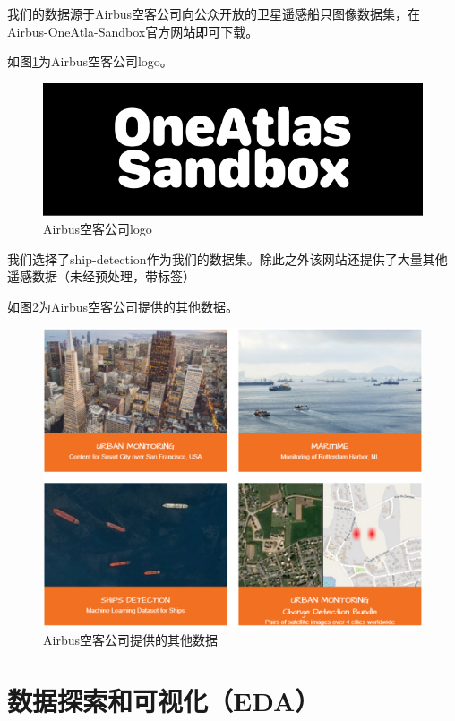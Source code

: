 我们的数据源于Airbus空客公司向公众开放的卫星遥感船只图像数据集，在Airbus-OneAtla-Sandbox官方网站即可下载。

如图\ref{fig::EDA3}为Airbus空客公司logo。

\begin{figure}[htbp]
\centering
\includegraphics[width=0.6\linewidth]{body/EDA_pic/OnaAtlasSandbox_Logo}
\caption{Airbus空客公司logo}
\label{fig::EDA3}
\end{figure}

我们选择了ship-detection作为我们的数据集。除此之外该网站还提供了大量其他遥感数据（未经预处理，带标签）

如图\ref{fig::EDA4}为Airbus空客公司提供的其他数据。

\begin{figure}[htbp]
\centering
\includegraphics[width=1\linewidth]{body/EDA_pic/data-sourse}
\caption{Airbus空客公司提供的其他数据}
\label{fig::EDA4}
\end{figure}

\chapter{数据探索和可视化（EDA）}\label{ux6570ux636eux63a2ux7d22ux548cux53efux89c6ux5316eda}

